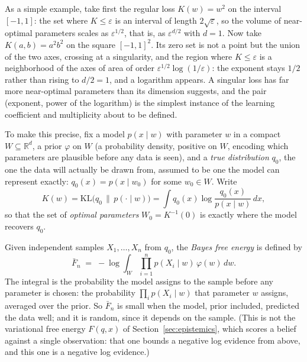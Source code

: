 As a simple example, take first the regular loss $K(w)=w^2$ on the interval $[-1,1]$: the set where $K\le\varepsilon$ is an interval of length $2\sqrt\varepsilon$, so the volume of near-optimal parameters scales as $\varepsilon^{1/2}$, that is, as $\varepsilon^{d/2}$ with $d=1$. Now take $K(a,b)=a^2b^2$ on the square $[-1,1]^2$. Its zero set is not a point but the union of the two axes, crossing at a singularity, and the region where $K\le\varepsilon$ is a neighborhood of the axes of area of order $\varepsilon^{1/2}\log(1/\varepsilon)$: the exponent stays $1/2$ rather than rising to $d/2=1$, and a logarithm appears. A singular loss has far more near-optimal parameters than its dimension suggests, and the pair (exponent, power of the logarithm) is the simplest instance of the learning coefficient and multiplicity about to be defined.

To make this precise, fix a model $p(x\mid w)$ with parameter $w$ in a compact $W\subseteq\mathbb{R}^d$, a prior $\varphi$ on $W$ (a probability density, positive on $W$, encoding which parameters are plausible before any data is seen), and a \emph{true distribution} $q_0$, the one the data will actually be drawn from, assumed to be one the model can represent exactly: $q_0(x)=p(x\mid w_0)$ for some $w_0\in W$. Write
\[
   K(w)=\mathrm{KL}\!\bigl(q_0 \,\big\|\, p(\cdot\mid w)\bigr)=\int q_0(x)\log\frac{q_0(x)}{p(x\mid w)}\,dx ,
\]
so that the set of \emph{optimal parameters} $W_0=K^{-1}(0)$ is exactly where the model recovers $q_0$.

Given independent samples $X_1,\dots,X_n$ from $q_0$, the \emph{Bayes free energy} is defined by
\[
   \bar F_n \;=\; -\log \int_W \prod_{i=1}^n p(X_i\mid w)\,\varphi(w)\,dw .
\]
The integral is the probability the model assigns to the sample before any parameter is chosen: the probability $\prod_i p(X_i\mid w)$ that parameter $w$ assigns, averaged over the prior. So $\bar F_n$ is small when the model, prior included, predicted the data well; and it is random, since it depends on the sample. (This is not the variational free energy $F(q,x)$ of Section~\ref{sec:epistemics}, which scores a belief against a single observation: that one bounds a negative log evidence from above, and this one is a negative log evidence.)

